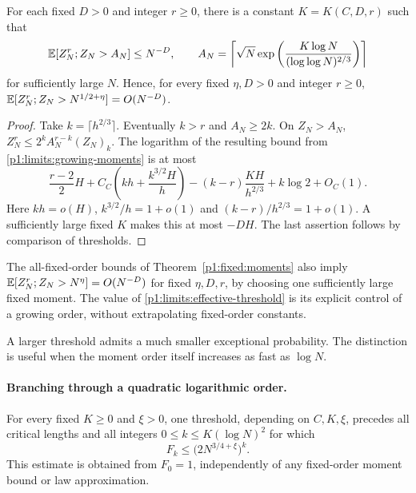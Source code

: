 \begin{proposition}
\label{p1:limits:effective-tail}
For each fixed $D>0$ and integer $r\ge0$, there is a constant
$K=K(C,D,r)$ such that
\begin{equation}
 \mathbb E[Z_N^r;Z_N>A_N]\le N^{-D},\qquad
 A_N=\left\lceil\sqrt N\exp\left(\frac{K\log N}
                                    {(\log\log N)^{2/3}}\right)\right\rceil
 \label{p1:limits:effective-threshold}
\end{equation}
for sufficiently large $N$.  Hence, for every fixed
$\eta,D>0$ and integer $r\ge0$,
$\mathbb E[Z_N^r;Z_N>N^{1/2+\eta}]=O(N^{-D})$.
\end{proposition}
\begin{proof}
Take $k=\lceil h^{2/3}\rceil$.  Eventually $k>r$ and
$A_N\ge2k$.  On $Z_N>A_N$,
$Z_N^r\le2^kA_N^{r-k}(Z_N)_k$.
The logarithm of the resulting bound from
\eqref{p1:limits:growing-moments} is at most
\[
 \frac{r-2}{2}H+C_C\left(kh+\frac{k^{3/2}H}{h}\right)
        -(k-r)\frac{KH}{h^{2/3}}+k\log2+O_C(1).
\]
Here $kh=o(H)$, $k^{3/2}/h=1+o(1)$ and
$(k-r)/h^{2/3}=1+o(1)$.  A sufficiently large fixed $K$
makes this at most $-DH$.  The last assertion follows by
comparison of thresholds.
\end{proof}

The all-fixed-order bounds of Theorem~\ref{p1:fixed:moments}
also imply $\mathbb E[Z_N^r;Z_N>N^\eta]=O(N^{-D})$ for fixed
$\eta,D,r$, by choosing one sufficiently large fixed moment.
The value of \eqref{p1:limits:effective-threshold} is its explicit
control of a growing order, without extrapolating fixed-order
constants.

A larger threshold admits a much smaller exceptional probability.
The distinction is useful when the moment order itself increases
as fast as $\log N$.

\paragraph{Branching through a quadratic logarithmic order.}
\label{p18:limits:quadratic-order}
For every fixed $K\ge0$ and $\xi>0$, one threshold, depending on
$C,K,\xi$, precedes all critical lengths and all integers
$0\le k\le K(\log N)^2$ for which
\[
                  F_k\le\bigl(2N^{3/4+\xi}\bigr)^k.
\]
This estimate is obtained from $F_0=1$, independently of any
fixed-order moment bound or law approximation.


